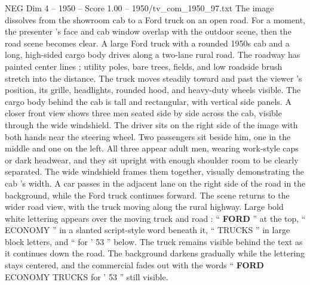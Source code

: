 \begin{textsample}{NEG Dim 4 – 1950 – Score 1.00 – 1950/tv\_com\_1950\_97.txt}
The image dissolves from the showroom cab to a Ford truck on an open road.
For a moment, the presenter ’s face and cab window overlap with the outdoor scene, then the road scene becomes clear.
A large Ford truck with a rounded 1950s cab and a long, high-sided cargo body drives along a two-lane rural road.
The roadway has painted center lines ; utility poles, bare trees, fields, and low roadside brush stretch into the distance.
The truck moves steadily toward and past the viewer ’s position, its grille, headlights, rounded hood, and heavy-duty wheels visible.
The cargo body behind the cab is tall and rectangular, with vertical side panels.
A closer front view shows three men seated side by side across the cab, visible through the wide windshield.
The driver sits on the right side of the image with both hands near the steering wheel.
Two passengers sit beside him, one in the middle and one on the left.
All three appear adult men, wearing work-style caps or dark headwear, and they sit upright with enough shoulder room to be clearly separated.
The wide windshield frames them together, visually demonstrating the cab ’s width.
A car passes in the adjacent lane on the right side of the road in the background, while the Ford truck continues forward.
The scene returns to the wider road view, with the truck moving along the rural highway.
Large bold white lettering appears over the moving truck and road : “ \textbf{FORD} ” at the top, “ ECONOMY ” in a slanted script-style word beneath it, “ TRUCKS ” in large block letters, and “ for ’ 53 ” below.
The truck remains visible behind the text as it continues down the road.
The background darkens gradually while the lettering stays centered, and the commercial fades out with the words “ \textbf{FORD} ECONOMY TRUCKS for ’ 53 ” still visible.

\end{textsample}
